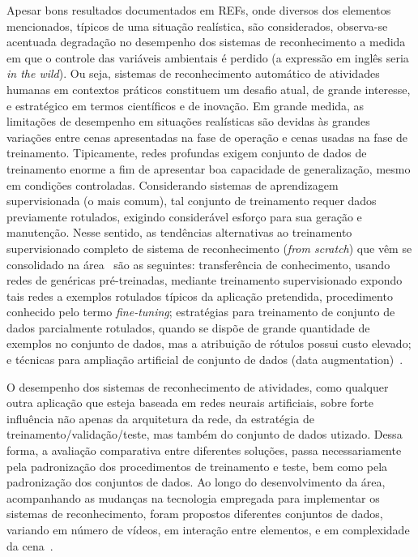%
Apesar bons resultados documentados em REFs, onde diversos dos elementos mencionados, típicos de uma situação realística, são considerados, observa-se acentuada degradação no desempenho dos sistemas de reconhecimento a medida em que o controle das variáveis ambientais é perdido (a expressão em inglês seria \emph{in the wild}). Ou seja, sistemas de reconhecimento automático de atividades humanas em contextos práticos constituem um desafio atual, de grande interesse, e estratégico em termos científicos e de inovação.
%
Em grande medida, as limitações de desempenho em situações realísticas são devidas às grandes variações entre cenas apresentadas na fase de operação e cenas usadas na fase de treinamento. Tipicamente, redes profundas exigem  conjunto de dados de treinamento enorme a fim de apresentar boa capacidade de generalização, mesmo em condições controladas. Considerando sistemas de aprendizagem supervisionada (o mais comum), tal conjunto de treinamento requer dados previamente rotulados, exigindo considerável esforço para sua geração e manutenção. Nesse sentido, as tendências alternativas ao treinamento supervisionado completo de sistema de reconhecimento (\emph{from scratch}) que vêm se consolidado na área~\parencite{herath-2017} são as seguintes: transferência de conhecimento, usando redes de genéricas pré-treinadas, mediante treinamento supervisionado expondo tais redes a exemplos rotulados típicos da aplicação pretendida, procedimento conhecido pelo termo \emph{fine-tuning}; estratégias para treinamento de conjunto de dados parcialmente rotulados, quando se dispõe de grande quantidade de exemplos no conjunto de dados, mas a atribuição de rótulos possui custo elevado; e técnicas para ampliação artificial de conjunto de dados (data augmentation)~\parencite{wang-2015}.

O desempenho dos sistemas de reconhecimento de atividades, como qualquer outra aplicação que esteja baseada em redes neurais artificiais, sobre forte influência não apenas da arquitetura da rede, da estratégia de treinamento/validação/teste, mas também do conjunto de dados utizado. Dessa forma, a avaliação comparativa entre diferentes soluções, passa necessariamente pela padronização dos procedimentos de treinamento e teste, bem como pela padronização dos conjuntos de dados.  Ao longo do desenvolvimento da área, acompanhando as mudanças na tecnologia empregada para implementar os sistemas de reconhecimento, foram propostos diferentes conjuntos de dados, variando em número de vídeos, em interação entre elementos, e em complexidade da cena~\parencite{jegham-2020, kongr-2018}. 

